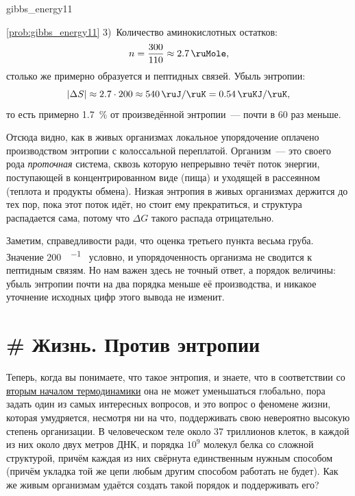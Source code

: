 \begin{problem}{}{gibbs_energy11}
\begin{sol}{\ref{prob:gibbs_energy11}}
        3)~Количество аминокислотных остатков:
        \begin{equation*}
            n = \frac{\num{300}}{\num{110}} \approx \qty{2,7}{\ruMole},
        \end{equation*}
        столько же примерно образуется и пептидных связей. Убыль энтропии:
        \begin{equation*}
            \left| \Delta S \right| \approx \num{2,7} \cdot \num{200} \approx \qty{540}{\ruJ\per\ruK} = \qty{0,54}{\ruKJ\per\ruK},
        \end{equation*}
        то есть примерно \qty{1,7}{\percent} от произведённой энтропии~--- почти в \num{60} раз меньше.

        Отсюда видно, как в живых организмах локальное упорядочение оплачено производством энтропии с колоссальной переплатой. Организм~--- это своего рода \emph{проточная} система, сквозь которую непрерывно течёт поток энергии, поступающей в концентрированном виде (пища) и уходящей в рассеянном (теплота и продукты обмена). Низкая энтропия в живых организмах держится до тех пор, пока этот поток идёт, но стоит ему прекратиться, и структура распадается сама, потому что $\Delta G$ такого распада отрицательно.

        Заметим, справедливости ради, что оценка третьего пункта весьма груба. Значение \qty{200}{\ruJ\per\ruK\ruMole} условно, и упорядоченность организма не сводится к пептидным связям. Но нам важен здесь не точный ответ, а порядок величины: убыль энтропии почти на два порядка меньше её производства, и никакое уточнение исходных цифр этого вывода не изменит.
    \end{sol}
\end{problem}

\clearpage

\section{\# Жизнь. Против энтропии}

Теперь, когда вы понимаете, что такое энтропия, и знаете, что в соответствии со \hyperref[term:second_law_of_thermodynamics]{вторым началом термодинамики} она не может уменьшаться глобально, пора задать один из самых интересных вопросов, и это вопрос о феномене жизни, которая умудряется, несмотря ни на что, поддерживать свою невероятно высокую степень организации. В человеческом теле около \num{37} триллионов клеток, в каждой из них около двух метров ДНК, и порядка $10^{9}$ молекул белка со сложной структурой, причём каждая из них свёрнута единственным нужным способом (причём укладка той же цепи любым другим способом работать не будет). Как же живым организмам удаётся создать такой порядок и поддерживать его?

